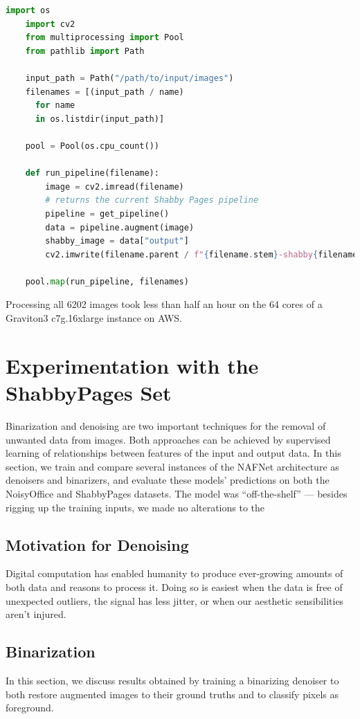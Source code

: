 \documentclass[runningheads]{llncs}
\begin{document}
\begin{lstlisting}[language=Python]
    import os
    import cv2
    from multiprocessing import Pool
    from pathlib import Path

    input_path = Path("/path/to/input/images")
    filenames = [(input_path / name)
      for name
      in os.listdir(input_path)]

    pool = Pool(os.cpu_count())

    def run_pipeline(filename):
        image = cv2.imread(filename)
        # returns the current Shabby Pages pipeline
        pipeline = get_pipeline()
        data = pipeline.augment(image)
        shabby_image = data["output"]
        cv2.imwrite(filename.parent / f"{filename.stem}-shabby{filename.suffix}")

    pool.map(run_pipeline, filenames)

\end{lstlisting}

Processing all 6202 images took less than half an hour on the 64 cores of a Graviton3 c7g.16xlarge instance on AWS.

\section{Experimentation with the ShabbyPages Set}
Binarization and denoising are two important techniques for the removal of unwanted data from images. Both approaches can be achieved by supervised learning of relationships between features of the input and output data. In this section, we train and compare several instances of the NAFNet \cite{ref_NAFNet} architecture as denoisers and binarizers, and evaluate these models' predictions on both the NoisyOffice and ShabbyPages datasets. The model was ``off-the-shelf'' — besides rigging up the training inputs, we made no alterations to the 

\subsection{Motivation for Denoising}
Digital computation has enabled humanity to produce ever-growing amounts of both data and reasons to process it. Doing so is easiest when the data is free of unexpected outliers, the signal has less jitter, or when our aesthetic sensibilities aren't injured.\\

\subsection{Binarization}
In this section, we discuss results obtained by training a binarizing denoiser to both restore augmented images to their ground truths and to classify pixels as foreground.\\
\end{document}
